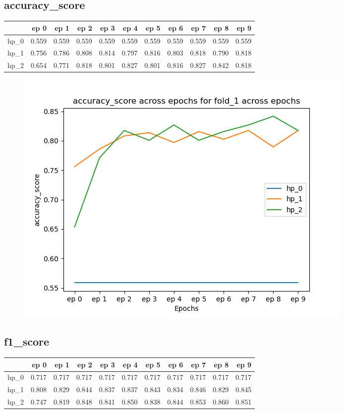 \documentclass{article}
\begin{document}
\subsection{accuracy\_score}
\begin{tabular}{lrrrrrrrrrr}
\toprule
{} &   ep 0 &   ep 1 &   ep 2 &   ep 3 &   ep 4 &   ep 5 &   ep 6 &   ep 7 &   ep 8 &   ep 9 \\
\midrule
hp\_0 &  0.559 &  0.559 &  0.559 &  0.559 &  0.559 &  0.559 &  0.559 &  0.559 &  0.559 &  0.559 \\
hp\_1 &  0.756 &  0.786 &  0.808 &  0.814 &  0.797 &  0.816 &  0.803 &  0.818 &  0.790 &  0.818 \\
hp\_2 &  0.654 &  0.771 &  0.818 &  0.801 &  0.827 &  0.801 &  0.816 &  0.827 &  0.842 &  0.818 \\
\bottomrule
\end{tabular}

\begin{figure}[H]
\includegraphics[scale = 0.75]{fold_1/accuracy_score}
\end{figure}
\subsection{f1\_score}
\begin{tabular}{lrrrrrrrrrr}
\toprule
{} &   ep 0 &   ep 1 &   ep 2 &   ep 3 &   ep 4 &   ep 5 &   ep 6 &   ep 7 &   ep 8 &   ep 9 \\
\midrule
hp\_0 &  0.717 &  0.717 &  0.717 &  0.717 &  0.717 &  0.717 &  0.717 &  0.717 &  0.717 &  0.717 \\
hp\_1 &  0.808 &  0.829 &  0.844 &  0.837 &  0.837 &  0.843 &  0.834 &  0.846 &  0.829 &  0.845 \\
hp\_2 &  0.747 &  0.819 &  0.848 &  0.841 &  0.850 &  0.838 &  0.844 &  0.853 &  0.860 &  0.851 \\
\bottomrule
\end{tabular}
\end{document}
